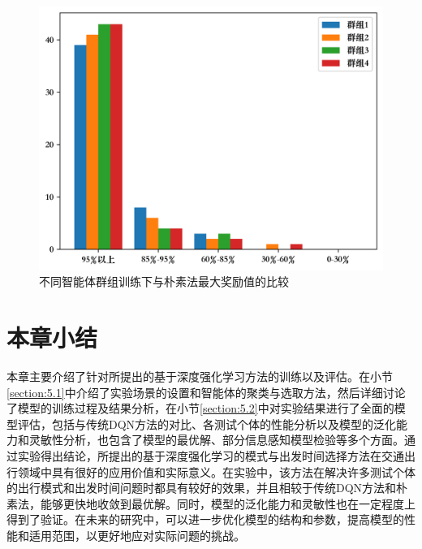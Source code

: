 \begin{figure}[H]
  \centering
  \includegraphics[width=.65\linewidth]{figures/content/set.png}
  \caption{不同智能体群组训练下与朴素法最大奖励值的比较}
  \label{agent_map}
\end{figure}

\section{本章小结}

本章主要介绍了针对所提出的基于深度强化学习方法的训练以及评估。在小节\ref{section:5.1}中介绍了实验场景的设置和智能体的聚类与选取方法，然后详细讨论了模型的训练过程及结果分析，在小节\ref{section:5.2}中对实验结果进行了全面的模型评估，包括与传统DQN方法的对比、各测试个体的性能分析以及模型的泛化能力和灵敏性分析，也包含了模型的最优解、部分信息感知模型检验等多个方面。通过实验得出结论，所提出的基于深度强化学习的模式与出发时间选择方法在交通出行领域中具有很好的应用价值和实际意义。在实验中，该方法在解决许多测试个体的出行模式和出发时间问题时都具有较好的效果，并且相较于传统DQN方法和朴素法，能够更快地收敛到最优解。同时，模型的泛化能力和灵敏性也在一定程度上得到了验证。在未来的研究中，可以进一步优化模型的结构和参数，提高模型的性能和适用范围，以更好地应对实际问题的挑战。
